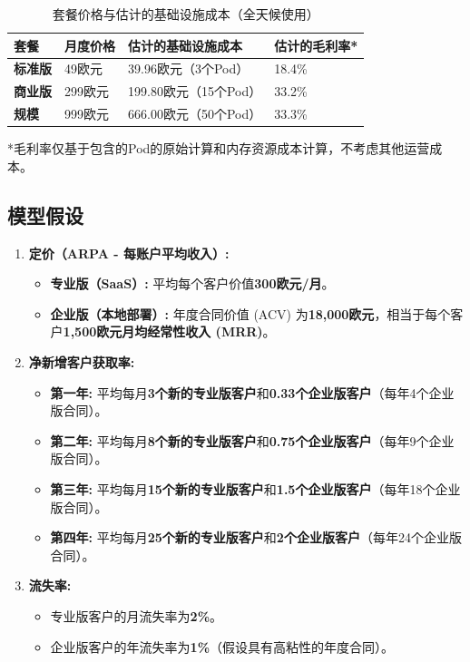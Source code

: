\documentclass[11pt, a4paper, oneside]{article}
\begin{document}
\begin{table}[H]
\centering
\caption{套餐价格与估计的基础设施成本（全天候使用）}
\label{tab:cost_analysis}
\begin{tabularx}{\textwidth}{L X X X} 
\toprule
\textbf{套餐} & \textbf{月度价格} & \textbf{估计的基础设施成本} & \textbf{估计的毛利率*} \\
\midrule
\textbf{标准版} & 49欧元 & 39.96欧元（3个Pod） & 18.4\% \\
\addlinespace
\textbf{商业版} & 299欧元 & 199.80欧元（15个Pod） & 33.2\% \\
\addlinespace
\textbf{规模} & 999欧元 & 666.00欧元（50个Pod） & 33.3\% \\
\bottomrule
\end{tabularx}
\raggedright
\footnotesize{*毛利率仅基于包含的Pod的原始计算和内存资源成本计算，不考虑其他运营成本。}
\end{table}



\subsection{模型假设}
\begin{enumerate}
    \item \textbf{定价（ARPA - 每账户平均收入）:}
    \begin{itemize}
        \item \textbf{专业版（SaaS）:} 平均每个客户价值\textbf{300欧元/月}。
        \item \textbf{企业版（本地部署）:} 年度合同价值 (ACV) 为\textbf{18,000欧元}，相当于每个客户\textbf{1,500欧元月均经常性收入 (MRR)}。
    \end{itemize}

    \item \textbf{净新增客户获取率:}
    \begin{itemize}
        \item \textbf{第一年:} 平均每月\textbf{3个新的专业版客户}和\textbf{0.33个企业版客户}（每年4个企业版合同）。
        \item \textbf{第二年:} 平均每月\textbf{8个新的专业版客户}和\textbf{0.75个企业版客户}（每年9个企业版合同）。
        \item \textbf{第三年:} 平均每月\textbf{15个新的专业版客户}和\textbf{1.5个企业版客户}（每年18个企业版合同）。
        \item \textbf{第四年:} 平均每月\textbf{25个新的专业版客户}和\textbf{2个企业版客户}（每年24个企业版合同）。
    \end{itemize}

    \item \textbf{流失率:}
    \begin{itemize}
        \item 专业版客户的月流失率为\textbf{2\%}。
        \item 企业版客户的年流失率为\textbf{1\%}（假设具有高粘性的年度合同）。
    \end{itemize}
\end{enumerate}
\end{document}
